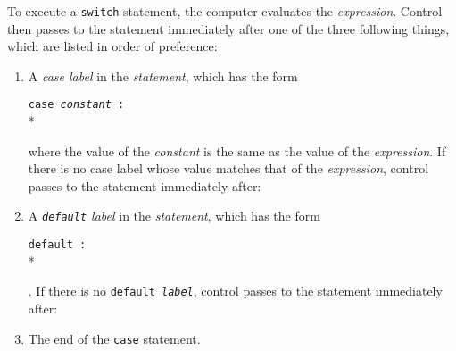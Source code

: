 \begin{itemize}
To execute a {\tt switch} statement, the computer evaluates the {\em
expression}\/.  Control then passes to the statement immediately after
one of the three following things, which are listed in order of
preference:
\begin{enumerate}
\item A {\em case label}\/ in the {\em statement}, which has the form 
\begin{flushleft}
{\tt case {\em constant} : } \\*
\end{flushleft}

\noindent where the value of the {\em constant}  is the same as the
value of the {\em expression}\/.  If there is no case label whose value
matches that of the {\em expression}, control passes to the statement
immediately after:

\item A {\em {\tt  default} label}\/ in the {\em statement}\/, which has
the form 
\begin{flushleft}
{\tt default : } \\*
\end{flushleft}

\noindent .  If there is no {\tt default \em label}\/, control passes to
the statement immediately after:

\item The end of the {\tt case} statement.  

\end{enumerate}



\end{itemize}



